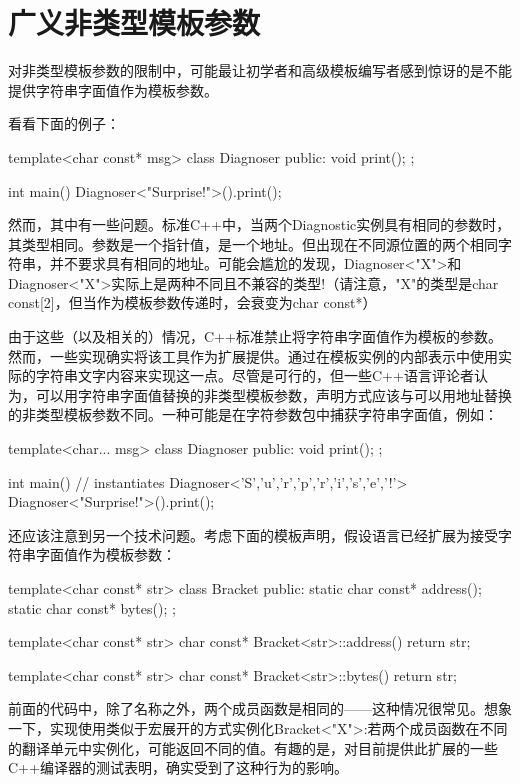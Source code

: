 \section{广义非类型模板参数}
对非类型模板参数的限制中，可能最让初学者和高级模板编写者感到惊讶的是不能提供字符串字面值作为模板参数。

看看下面的例子：

\begin{cpp}
template<char const* msg>
class Diagnoser {
	public:
	void print();
};

int main()
{
	Diagnoser<"Surprise!">().print();
}
\end{cpp}

然而，其中有一些问题。标准C++中，当两个Diagnostic实例具有相同的参数时，其类型相同。参数是一个指针值，是一个地址。但出现在不同源位置的两个相同字符串，并不要求具有相同的地址。可能会尴尬的发现，Diagnoser<"X">和Diagnoser<"X">实际上是两种不同且不兼容的类型!（请注意，"X"的类型是char const[2]，但当作为模板参数传递时，会衰变为char const*）

由于这些（以及相关的）情况，C++标准禁止将字符串字面值作为模板的参数。然而，一些实现确实将该工具作为扩展提供。通过在模板实例的内部表示中使用实际的字符串文字内容来实现这一点。尽管是可行的，但一些C++语言评论者认为，可以用字符串字面值替换的非类型模板参数，声明方式应该与可以用地址替换的非类型模板参数不同。一种可能是在字符参数包中捕获字符串字面值，例如：

\begin{cpp}
template<char... msg>
class Diagnoser {
	public:
	void print();
};

int main()
{
	// instantiates Diagnoser<'S','u','r','p','r','i','s','e','!'>
	Diagnoser<"Surprise!">().print();
}
\end{cpp}

还应该注意到另一个技术问题。考虑下面的模板声明，假设语言已经扩展为接受字符串字面值作为模板参数：

\begin{cpp}
template<char const* str>
class Bracket {
	public:
	static char const* address();
	static char const* bytes();
};

template<char const* str>
char const* Bracket<str>::address()
{
	return str;
}

template<char const* str>
char const* Bracket<str>::bytes()
{
	return str;
}
\end{cpp}

前面的代码中，除了名称之外，两个成员函数是相同的——这种情况很常见。想象一下，实现使用类似于宏展开的方式实例化Bracket<"X">:若两个成员函数在不同的翻译单元中实例化，可能返回不同的值。有趣的是，对目前提供此扩展的一些C++编译器的测试表明，确实受到了这种行为的影响。

